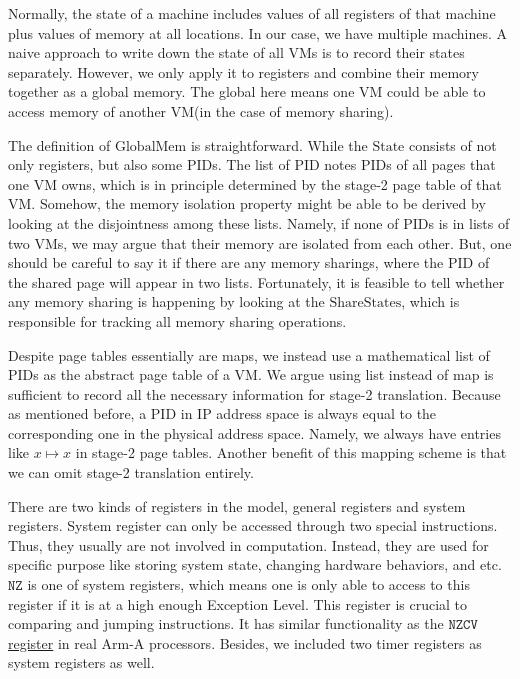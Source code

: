 \documentclass[a4paper]{article}
\newcommand*{\STATE}{\text{State}}
\newcommand*{\MEM}{\text{GlobalMem}}
\newcommand*{\SSS}{\text{ShareStates}}
\newcommand*{\PID}{\text{PID}}
\begin{document}
Normally, the state of a machine includes values of all
registers of that machine plus values of memory at all locations. In our case,
we have multiple machines. A naive approach to write down the state of all VMs
is to record their states separately. However, we only apply it to registers and
combine their memory together as a global memory. The global here means one VM
could be able to access memory of another VM(in the case of memory sharing).

The definition of $\MEM$ is straightforward. While the $\STATE$ consists of not
only registers, but also some $\PID$s.
The list of $\PID$ notes $\PID$s of all
pages that one VM owns, which is in principle determined by the stage-2 page
table of that VM.
Somehow, the memory isolation property might be able to be derived
by looking at the disjointness among these lists. Namely, if none of $\PID$s is in
lists of two VMs, we may argue that their memory are isolated from each other.
But, one should be careful to say it if there are any memory sharings, where the $\PID$
of the shared page will appear in two lists. Fortunately, it is feasible to tell
whether any memory sharing is happening by looking at the $\SSS$, which is responsible
for tracking all memory sharing operations.

Despite page tables essentially are maps, we instead use a mathematical list of
$\PID$s as the abstract page table of a VM.
We argue using list instead of map is sufficient to record all the necessary
information for stage-2 translation. Because as mentioned before, a $\PID$ in IP address
space is always equal to the corresponding one in the physical address space.
Namely, we always have entries like $x \mapsto x$ in stage-2 page tables.
Another benefit of this mapping scheme is that we can omit stage-2 translation entirely.



There are two kinds of registers in the model, general registers and system
registers. System register can only be accessed through two special
instructions. Thus, they usually are not involved in computation. Instead, they
are used for specific purpose like storing system state, changing hardware
behaviors, and etc. $\mathtt{NZ}$ is one of system registers, which means one is
only able to access to this register if it is at a high enough Exception Level.
This register is crucial to comparing and jumping instructions. It has similar
functionality as the
\href{https://developer.arm.com/docs/ddi0595/h/aarch64-system-registers/nzcv}
{$\mathtt{NZCV}$ register} in real Arm-A processors. Besides, we included two
timer registers as system registers as well.
\end{document}
